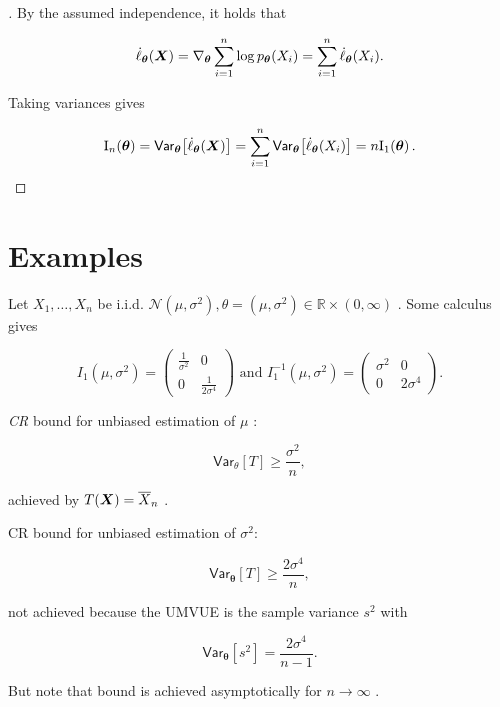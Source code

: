 \begin{proof}[]
By the assumed independence, it holds that

\[\dot{\ell}_{\boldsymbol{\theta}}(\boldsymbol{X}) = \nabla_{\boldsymbol{\theta}} \sum_{i=1}^{n} \log p_{\boldsymbol{\theta}}(X_i) = \sum_{i=1}^{n} \dot{\ell}_{\boldsymbol{\theta}}(X_i).\]

Taking variances gives

\[\mathrm{I}_n(\boldsymbol{\theta}) = \mathsf{Var}_{\boldsymbol{\boldsymbol{\theta}}} \big[ \dot{\ell}_{\boldsymbol{\boldsymbol{\theta}}}(\boldsymbol{X}) \big] = \sum_{i=1}^n \mathsf{Var}_{\boldsymbol{\boldsymbol{\theta}}} \big[ \dot{\ell}_{\boldsymbol{\boldsymbol{\theta}}}(X_i) \big] = n \mathrm{I}_1(\boldsymbol{\boldsymbol{\theta}}) \,.\]
\end{proof}

\section{Examples}%
\label{sec:Examples}

\begin{ex}
    \label{ex:gm}
    
Let \(X_1, \ldots, X_n\) be i.i.d.
\(\mathcal{N}(\mu, \sigma^2), \theta = (\mu, \sigma^2) \in \mathbb{R} \times (0, \infty)\)
. Some calculus gives

\[I_1(\mu, \sigma^2) = \begin{pmatrix} \frac{1}{\sigma^2} & 0\\ 0 & \frac{1}{2\sigma^4} \end{pmatrix} \text{ and } I_1^{-1}(\mu, \sigma^2) = \begin{pmatrix} \sigma^2 & 0\\ 0 & 2\sigma^4 \end{pmatrix}.\]

\emph{CR} bound for unbiased estimation of \(\mu\) :

\[\mathsf{Var}_{\theta}[T] \ge \frac{\sigma^2}{n},\] 

achieved by \(T(\boldsymbol{X}) = \overline{X}_n\) .

CR bound for unbiased estimation of \(\sigma^2\):

\[\mathsf{Var}_{\boldsymbol{\theta}}[T] \ge \frac{2\sigma^4}{n},\]


not achieved because the UMVUE is the sample variance \(s^2\) with

\[\mathsf{Var}_{\boldsymbol{\theta}}[s^2] = \frac{2\sigma^4}{n-1}.\]

But note that bound is achieved asymptotically for \(n \to \infty\) .
\end{ex}

